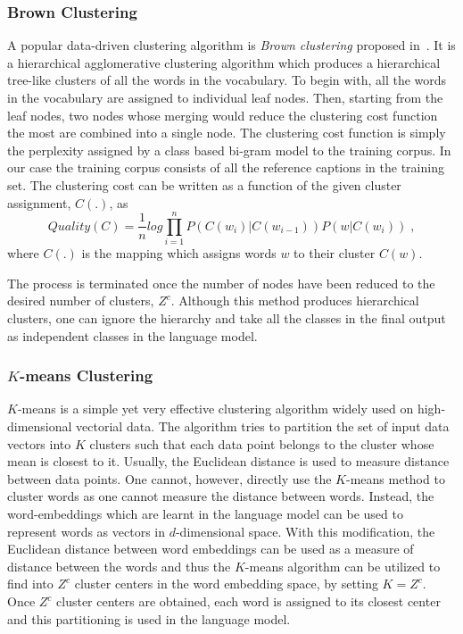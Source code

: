 \subsubsection*{Brown Clustering}
A popular data-driven clustering algorithm is \emph{Brown clustering} proposed
in~\cite{BrownClust}.
It is a hierarchical agglomerative clustering algorithm which produces a hierarchical
tree-like clusters of all the words in the vocabulary.
To begin with, all the words in the vocabulary are assigned to individual leaf
nodes. 
Then, starting from the leaf nodes, two nodes whose merging would reduce the
clustering cost function the most are combined into a single node.
The clustering cost function is simply the perplexity assigned by a class based
bi-gram model to the training corpus. 
In our case the training corpus consists of all the reference captions in the
training set.
The clustering cost can be written as a function of the given cluster
assignment, $C(.)$, as 
\begin{equation}
  \label{eq:brown} 
        Quality(C) = \frac{1}{n} log \prod_{i=1}^{n} P(C(w_i)|C(w_{i-1})) P(w|C(w_i)) \; ,
\end{equation}
\noindent where $C(.)$ is the mapping which assigns words $w$ to their cluster
$C(w)$.

The process is terminated once the number of nodes have been reduced to the
desired number of clusters, $Z^c$.
Although this method produces hierarchical clusters, one can ignore the
hierarchy and take all the classes in the final output as independent classes in
the language model. 
\subsubsection*{$K$-means Clustering}

$K$-means is a simple yet very effective clustering algorithm widely used on
high-dimensional vectorial data.
The algorithm tries to partition the set of input data vectors into $K$ clusters
such that each data point belongs to the cluster whose mean is closest to
it.
Usually, the Euclidean distance is used to measure distance between data points.
One cannot, however, directly use the $K$-means method to cluster words as one
cannot measure the distance between words.
Instead, the word-embeddings which are learnt in the language model can be used
to represent words as vectors in $d$-dimensional space.
With this modification, the Euclidean distance between word embeddings can be
used as a measure of distance between the words and thus the $K$-means algorithm
can be utilized to find into $Z^c$ cluster centers in the word embedding space,
by setting $K=Z^c$.
Once $Z^c$ cluster centers are obtained, each word is assigned to its closest
center and this partitioning is used in the language model.

